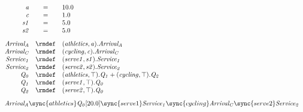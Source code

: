 \begin{displaymath}
	\begin{array}{rcl}
		\mathit{a} & = & 10.0\\
		\mathit{c} & = & 1.0\\
		\mathit{s1} & = & 5.0\\
		\mathit{s2} & = & 5.0\\
[2.0ex]		\mathit{Arrival_A} & \rmdef & (\mathit{athletics},\mathit{a}).\mathit{Arrival_A}\\
		\mathit{Arrival_C} & \rmdef & (\mathit{cycling},\mathit{c}).\mathit{Arrival_C}\\
		\mathit{Service_1} & \rmdef & (\mathit{serve1},\mathit{s1}).\mathit{Service_1}\\
		\mathit{Service_2} & \rmdef & (\mathit{serve2},\mathit{s2}).\mathit{Service_2}\\
		\mathit{Q_0} & \rmdef & (\mathit{athletics},\top).\mathit{Q_1}+(\mathit{cycling},\top).\mathit{Q_2}\\
		\mathit{Q_1} & \rmdef & (\mathit{serve1},\top).\mathit{Q_0}\\
		\mathit{Q_2} & \rmdef & (\mathit{serve2},\top).\mathit{Q_0}\\
[2.0ex]		\multicolumn{3}{l}{\mathit{Arrival_A}\sync{athletics}\mathit{Q_0}[20.0]\sync{serve1}\mathit{Service_1}\sync{cycling}\mathit{Arrival_C}\sync{serve2}\mathit{Service_2}}\\
[2.0ex]	\end{array}
\end{displaymath}
